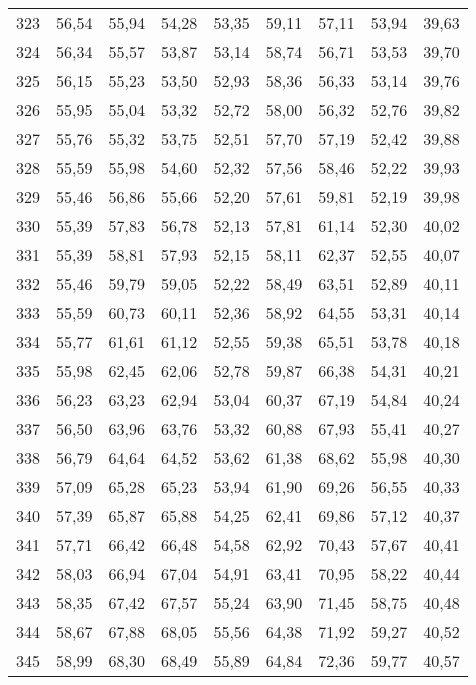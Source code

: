 \begin{longtable}{c c c c c c c c c}
      323& 	56,54& 	55,94& 	54,28& 	53,35& 	59,11& 	57,11& 	53,94& 	39,63 \\
      324& 	56,34& 	55,57& 	53,87& 	53,14& 	58,74& 	56,71& 	53,53& 	39,70 \\
      325& 	56,15& 	55,23& 	53,50& 	52,93& 	58,36& 	56,33& 	53,14& 	39,76 \\
      326& 	55,95& 	55,04& 	53,32& 	52,72& 	58,00& 	56,32& 	52,76& 	39,82 \\
      327& 	55,76& 	55,32& 	53,75& 	52,51& 	57,70& 	57,19& 	52,42& 	39,88 \\
      328& 	55,59& 	55,98& 	54,60& 	52,32& 	57,56& 	58,46& 	52,22& 	39,93 \\
      329& 	55,46& 	56,86& 	55,66& 	52,20& 	57,61& 	59,81& 	52,19& 	39,98 \\
      330& 	55,39& 	57,83& 	56,78& 	52,13& 	57,81& 	61,14& 	52,30& 	40,02 \\
      331& 	55,39& 	58,81& 	57,93& 	52,15& 	58,11& 	62,37& 	52,55& 	40,07 \\
      332& 	55,46& 	59,79& 	59,05& 	52,22& 	58,49& 	63,51& 	52,89& 	40,11 \\
      333& 	55,59& 	60,73& 	60,11& 	52,36& 	58,92& 	64,55& 	53,31& 	40,14 \\
      334& 	55,77& 	61,61& 	61,12& 	52,55& 	59,38& 	65,51& 	53,78& 	40,18 \\
      335& 	55,98& 	62,45& 	62,06& 	52,78& 	59,87& 	66,38& 	54,31& 	40,21 \\
      336& 	56,23& 	63,23& 	62,94& 	53,04& 	60,37& 	67,19& 	54,84& 	40,24 \\
      337& 	56,50& 	63,96& 	63,76& 	53,32& 	60,88& 	67,93& 	55,41& 	40,27 \\
      338& 	56,79& 	64,64& 	64,52& 	53,62& 	61,38& 	68,62& 	55,98& 	40,30 \\
      339& 	57,09& 	65,28& 	65,23& 	53,94& 	61,90& 	69,26& 	56,55& 	40,33 \\
      340& 	57,39& 	65,87& 	65,88& 	54,25& 	62,41& 	69,86& 	57,12& 	40,37 \\
      341& 	57,71& 	66,42& 	66,48& 	54,58& 	62,92& 	70,43& 	57,67& 	40,41 \\
      342& 	58,03& 	66,94& 	67,04& 	54,91& 	63,41& 	70,95& 	58,22& 	40,44 \\
      343& 	58,35& 	67,42& 	67,57& 	55,24& 	63,90& 	71,45& 	58,75& 	40,48 \\
      344& 	58,67& 	67,88& 	68,05& 	55,56& 	64,38& 	71,92& 	59,27& 	40,52 \\
      345& 	58,99& 	68,30& 	68,49& 	55,89& 	64,84& 	72,36& 	59,77& 	40,57 \\

\end{longtable}
